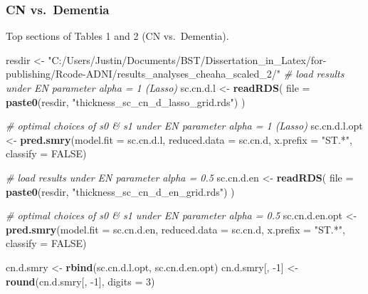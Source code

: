 \documentclass[
]{article}
\newenvironment{Shaded}{\begin{snugshade}}{\end{snugshade}}
\newcommand{\CommentTok}[1]{\textcolor[rgb]{0.56,0.35,0.01}{\textit{#1}}}
\newcommand{\DataTypeTok}[1]{\textcolor[rgb]{0.13,0.29,0.53}{#1}}
\newcommand{\DecValTok}[1]{\textcolor[rgb]{0.00,0.00,0.81}{#1}}
\newcommand{\KeywordTok}[1]{\textcolor[rgb]{0.13,0.29,0.53}{\textbf{#1}}}
\newcommand{\NormalTok}[1]{#1}
\newcommand{\OtherTok}[1]{\textcolor[rgb]{0.56,0.35,0.01}{#1}}
\newcommand{\StringTok}[1]{\textcolor[rgb]{0.31,0.60,0.02}{#1}}
\begin{document}
\hypertarget{cn-vs.-dementia}{%
\subsubsection{CN vs.~Dementia}\label{cn-vs.-dementia}}

Top sections of Tables 1 and 2 (CN vs.~Dementia).

\begin{Shaded}
\begin{Highlighting}[]
\NormalTok{resdir <-}\StringTok{ "C:/Users/Justin/Documents/BST/Dissertation_in_Latex/for-publishing/Rcode-ADNI/results_analyses_cheaha_scaled_2/"}
\CommentTok{# load results under EN parameter alpha = 1 (Lasso)}
\NormalTok{sc.cn.d.l <-}\StringTok{ }\KeywordTok{readRDS}\NormalTok{(}
  \DataTypeTok{file =} \KeywordTok{paste0}\NormalTok{(resdir, }\StringTok{"thickness_sc_cn_d_lasso_grid.rds"}\NormalTok{)}
\NormalTok{)}

\CommentTok{# optimal choices of s0 & s1 under EN parameter alpha = 1 (Lasso)}
\NormalTok{sc.cn.d.l.opt <-}\StringTok{ }\KeywordTok{pred.smry}\NormalTok{(}\DataTypeTok{model.fit =}\NormalTok{ sc.cn.d.l,}
                       \DataTypeTok{reduced.data =}\NormalTok{ sc.cn.d,}
                       \DataTypeTok{x.prefix =} \StringTok{"ST.*"}\NormalTok{,}
                       \DataTypeTok{classify =} \OtherTok{FALSE}\NormalTok{)}

\CommentTok{# load results under EN parameter alpha = 0.5}
\NormalTok{sc.cn.d.en <-}\StringTok{ }\KeywordTok{readRDS}\NormalTok{(}
  \DataTypeTok{file =} \KeywordTok{paste0}\NormalTok{(resdir, }\StringTok{"thickness_sc_cn_d_en_grid.rds"}\NormalTok{)}
\NormalTok{)}

\CommentTok{# optimal choices of s0 & s1 under EN parameter alpha = 0.5}
\NormalTok{sc.cn.d.en.opt <-}\StringTok{ }\KeywordTok{pred.smry}\NormalTok{(}\DataTypeTok{model.fit =}\NormalTok{ sc.cn.d.en,}
                       \DataTypeTok{reduced.data =}\NormalTok{ sc.cn.d,}
                       \DataTypeTok{x.prefix =} \StringTok{"ST.*"}\NormalTok{,}
                       \DataTypeTok{classify =} \OtherTok{FALSE}\NormalTok{)}

\NormalTok{cn.d.smry <-}\StringTok{ }\KeywordTok{rbind}\NormalTok{(sc.cn.d.l.opt,}
\NormalTok{                   sc.cn.d.en.opt)}
\NormalTok{cn.d.smry[, }\DecValTok{-1}\NormalTok{] <-}\StringTok{ }\KeywordTok{round}\NormalTok{(cn.d.smry[, }\DecValTok{-1}\NormalTok{], }\DataTypeTok{digits =} \DecValTok{3}\NormalTok{)}
\end{Highlighting}
\end{Shaded}
\end{document}
